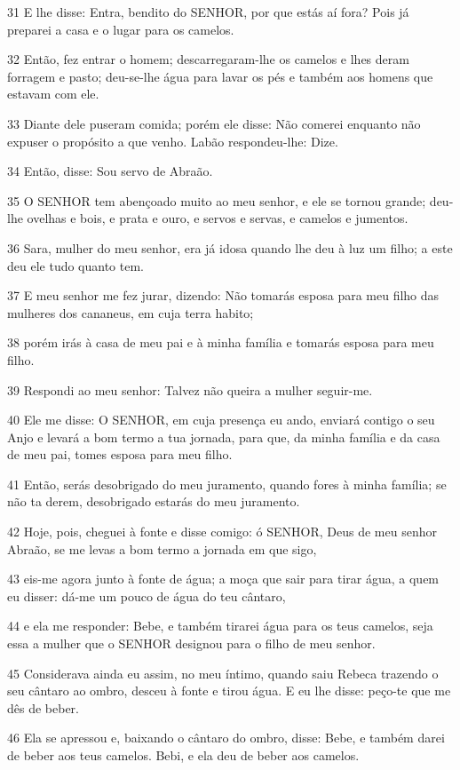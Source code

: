 \par 31 E lhe disse: Entra, bendito do SENHOR, por que estás aí fora? Pois já preparei a casa e o lugar para os camelos.
\par 32 Então, fez entrar o homem; descarregaram-lhe os camelos e lhes deram forragem e pasto; deu-se-lhe água para lavar os pés e também aos homens que estavam com ele.
\par 33 Diante dele puseram comida; porém ele disse: Não comerei enquanto não expuser o propósito a que venho. Labão respondeu-lhe: Dize.
\par 34 Então, disse: Sou servo de Abraão.
\par 35 O SENHOR tem abençoado muito ao meu senhor, e ele se tornou grande; deu-lhe ovelhas e bois, e prata e ouro, e servos e servas, e camelos e jumentos.
\par 36 Sara, mulher do meu senhor, era já idosa quando lhe deu à luz um filho; a este deu ele tudo quanto tem.
\par 37 E meu senhor me fez jurar, dizendo: Não tomarás esposa para meu filho das mulheres dos cananeus, em cuja terra habito;
\par 38 porém irás à casa de meu pai e à minha família e tomarás esposa para meu filho.
\par 39 Respondi ao meu senhor: Talvez não queira a mulher seguir-me.
\par 40 Ele me disse: O SENHOR, em cuja presença eu ando, enviará contigo o seu Anjo e levará a bom termo a tua jornada, para que, da minha família e da casa de meu pai, tomes esposa para meu filho.
\par 41 Então, serás desobrigado do meu juramento, quando fores à minha família; se não ta derem, desobrigado estarás do meu juramento.
\par 42 Hoje, pois, cheguei à fonte e disse comigo: ó SENHOR, Deus de meu senhor Abraão, se me levas a bom termo a jornada em que sigo,
\par 43 eis-me agora junto à fonte de água; a moça que sair para tirar água, a quem eu disser: dá-me um pouco de água do teu cântaro,
\par 44 e ela me responder: Bebe, e também tirarei água para os teus camelos, seja essa a mulher que o SENHOR designou para o filho de meu senhor.
\par 45 Considerava ainda eu assim, no meu íntimo, quando saiu Rebeca trazendo o seu cântaro ao ombro, desceu à fonte e tirou água. E eu lhe disse: peço-te que me dês de beber.
\par 46 Ela se apressou e, baixando o cântaro do ombro, disse: Bebe, e também darei de beber aos teus camelos. Bebi, e ela deu de beber aos camelos.
